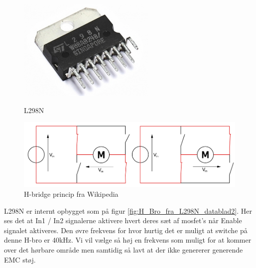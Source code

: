 \begin{figure}[ht]
	\centering
	\begin{minipage}[b]{0.29\linewidth}
		\includegraphics[width=\textwidth* 9/10]{../fig/billeder/L298N}
		\caption{L298N}
		\label{fig:L298N}
	\end{minipage}
	\quad
	\begin{minipage}[b]{0.68\linewidth}
		\includegraphics[width=\textwidth* 9/10]{../fig/billeder/H_bridge_operating}
		\caption{H-bridge princip fra Wikipedia \cite{lib:wikiHbro}}
		\label{fig:H-bridge}
	\end{minipage}
\end{figure}

L298N er internt opbygget som på figur \ref{fig:H_Bro_fra_L298N_datablad2}. Her ses det at In1 / In2 signalerne aktivere hvert deres sæt af mosfet's når Enable signalet aktiveres. Den øvre frekvens for hvor hurtig det er muligt at switche på denne H-bro er 40kHz. Vi vil vælge så høj en frekvens som muligt for at kommer over det hørbare område men samtidig så lavt at der ikke genererer generende EMC støj.

